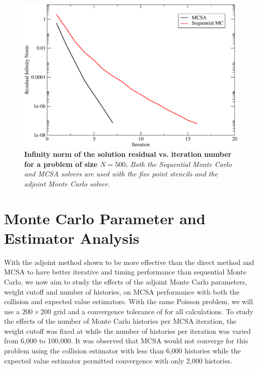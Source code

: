\begin{figure}[t!]
  \centering
  \includegraphics[width=4.5in,clip]{chapters/mc_background/seq_conv_500.pdf}
  \caption{\textbf{Infinity norm of the solution residual
      vs. iteration number for a problem of size $N=500$.}
    \textit{Both the Sequential Monte Carlo and MCSA solvers are used
      with the five point stencils and the adjoint Monte Carlo
      solver.}}
  \label{fig:seq_500}
\end{figure}

\clearpage

\section{Monte Carlo Parameter and Estimator Analysis}
\label{sec:parameter_estimator_analysis}
With the adjoint method shown to be more effective than the direct
method and MCSA to have better iterative and timing performance than
sequential Monte Carlo, we now aim to study the effects of the adjoint
Monte Carlo parameters, weight cutoff and number of histories, on MCSA
performance with both the collision and expected value
estimators. With the same Poisson problem, we will use a $200 \times
200$ grid and a convergence tolerance of  for all
calculations. To study the effects of the number of Monte Carlo
histories per MCSA iteration, the weight cutoff was fixed at
 while the number of histories per iteration was varied from
6,000 to 100,000. It was observed that MCSA would not converge for
this problem using the collision estimator with less than 6,000
histories while the expected value estimator permitted convergence
with only 2,000 histories. 

